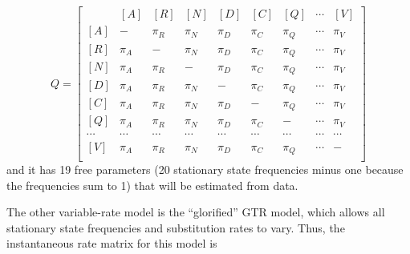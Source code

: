 \documentclass[12pt]{book}
\begin{document}
\footnotesize
\[
Q=\begin{bmatrix}
    & [A] & [R] & [N] & [D] & [C] & [Q] & \cdots & [V]\\
 [A]& - & \pi_{R} & \pi_{N} & \pi_{D}& \pi_{C}& \pi_{Q} & \cdots & \pi_V\\
 [R]& \pi_{A} &- &  \pi_{N} & \pi_{D}& \pi_{C}& \pi_{Q} & \cdots & \pi_V\\
 [N]& \pi_{A} &\pi_{R} &- &   \pi_{D}& \pi_{C}& \pi_{Q} & \cdots & \pi_V\\
 [D]& \pi_{A} &\pi_{R} &  \pi_{N}&- &  \pi_{C}& \pi_{Q} & \cdots & \pi_V\\
 [C]& \pi_{A} &\pi_{R} &  \pi_{N}&  \pi_{D}&- & \pi_{Q} & \cdots & \pi_V\\
 [Q]& \pi_{A} &\pi_{R} &  \pi_{N}&  \pi_{D}& \pi_{C} &- & \cdots & \pi_V\\
 \cdots& \cdots& \cdots& \cdots& \cdots& \cdots& \cdots& \cdots& \cdots\\
 [V]& \pi_{A} &\pi_{R} &  \pi_{N}&  \pi_{D}& \pi_{C} &\pi_Q & \cdots &- \\
\end{bmatrix}
\]
\normalsize
and it has 19 free parameters (20 stationary state frequencies minus one because the frequencies
sum to 1) that will be estimated from data.

The other variable-rate model is the ``glorified'' GTR model, which allows all stationary state
frequencies and substitution rates to vary. Thus, the instantaneous rate matrix for this model is
\end{document}
